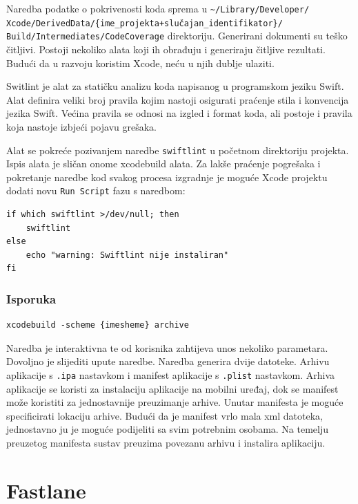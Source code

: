 \documentclass[times, utf8, diplomski, numeric]{fer}
\begin{document}
\begin{appendices}
Naredba podatke o pokrivenosti koda sprema u \verb|~/Library/Developer/|\\\verb|Xcode/DerivedData/{ime_projekta+slučajan_identifikator}/|\\\verb|Build/Intermediates/CodeCoverage| direktoriju. Generirani dokumenti su teško čitljivi. Postoji nekoliko alata koji ih obrađuju i generiraju čitljive rezultati. Budući da u razvoju koristim Xcode, neću u njih dublje ulaziti.

Switlint je alat za statičku analizu koda napisanog u programskom jeziku Swift. Alat definira veliki broj pravila kojim nastoji osigurati praćenje stila i konvencija jezika Swift. Većina pravila se odnosi na izgled i format koda, ali postoje i pravila koja nastoje izbjeći pojavu grešaka.

Alat se pokreće pozivanjem naredbe \verb|swiftlint| u početnom direktoriju projekta. Ispis alata je sličan onome xcodebuild alata. Za lakše praćenje pogrešaka i pokretanje naredbe kod svakog procesa izgradnje je moguće Xcode projektu dodati novu \verb|Run Script| fazu s naredbom:

\begin{verbatim}
if which swiftlint >/dev/null; then
    swiftlint
else
    echo "warning: Swiftlint nije instaliran"
fi
\end{verbatim}

\subsection{Isporuka}

\begin{verbatim}
xcodebuild -scheme {imesheme} archive
\end{verbatim}

Naredba je interaktivna te od korisnika zahtijeva unos nekoliko parametara. Dovoljno je slijediti upute naredbe. Naredba generira dvije datoteke. Arhivu aplikacije s \verb|.ipa| nastavkom i manifest aplikacije s \verb|.plist| nastavkom. Arhiva aplikacije se koristi za instalaciju aplikacije na mobilni uređaj, dok se manifest može koristiti za jednostavnije preuzimanje arhive. Unutar manifesta je moguće specificirati lokaciju arhive. Budući da je manifest vrlo mala xml datoteka, jednostavno ju je moguće podijeliti sa svim potrebnim osobama. Na temelju preuzetog manifesta sustav preuzima povezanu arhivu i instalira aplikaciju.



\chapter{Fastlane} \label{header:dodatak_fastlane}


\end{appendices}
\end{document}
